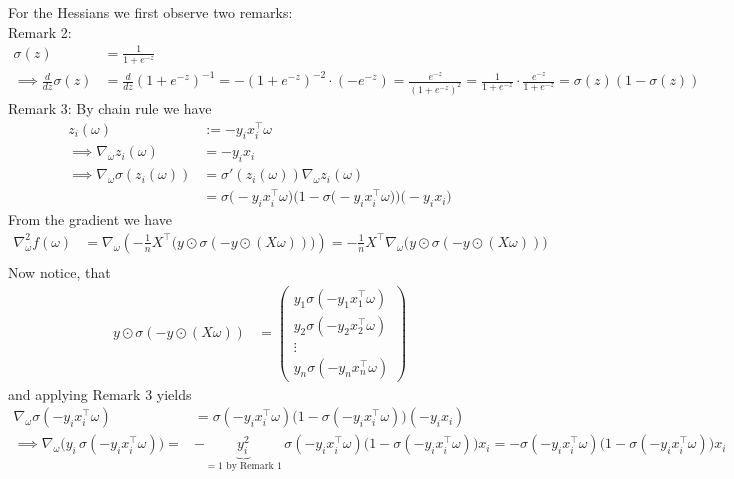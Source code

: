 \documentclass{article}
\begin{document}
For the Hessians we first observe two remarks:\\
Remark 2:
\begin{align*}
  \sigma(z) &= \frac{1}{1 + e^{-z}} \\
  \implies \frac{d}{dz} \sigma(z) &= \frac{d}{dz} (1 + e^{-z})^{-1}
  = -(1 + e^{-z})^{-2} \cdot (-e^{-z}) = \frac{e^{-z}}{(1 + e^{-z})^2}
  = \frac{1}{1 + e^{-z}} \cdot \frac{e^{-z}}{1 + e^{-z}}
  = \sigma(z) (1 - \sigma(z))
\end{align*}
Remark 3: By chain rule we have
\begin{align*}
z_i(\omega) &:= -y_i x_i^\top \omega \\
\implies \nabla_\omega z_i(\omega) &= -y_i x_i \\
\implies \nabla_\omega \sigma(z_i(\omega)) 
&= \sigma'(z_i(\omega)) \nabla_\omega z_i(\omega) \\
&= \sigma\bigl(-y_i x_i^\top \omega\bigr)\bigl(1 - \sigma\bigl(-y_i x_i^\top \omega\bigr)\bigr)\bigl(-y_i x_i\bigr)
\end{align*}
%
From the gradient we have
\begin{align*}
\nabla^2_\omega f(\omega) 
&= \nabla_\omega \left( -\frac{1}{n} X^\top \big(y \odot \sigma(-y \odot (X\omega))\big) \right) = -\frac{1}{n} X^\top \nabla_\omega \big(y \odot \sigma(-y \odot (X\omega))\big) \\
%
\end{align*}
Now notice, that
\begin{align*}
y \odot \sigma(-y \odot (X\omega)) &= \begin{pmatrix}
y_1 \sigma(-y_1 x_1^\top \omega) \\
y_2 \sigma(-y_2 x_2^\top \omega) \\
\vdots \\
y_n \sigma(-y_n x_n^\top \omega)
\end{pmatrix}
\end{align*}
and applying Remark 3 yields 
\begin{align*}
\nabla_\omega \sigma(-y_i x_i^\top \omega) 
&= \sigma(-y_i x_i^\top \omega)\big(1 - \sigma(-y_i x_i^\top \omega)\big)(-y_i x_i) \\
%
\implies \nabla_\omega \big(y_i \, \sigma(-y_i x_i^\top \omega)\big) 
=& -\underbrace{y_i^2}_{=1 \text{ by Remark 1}} \, \sigma(-y_i x_i^\top \omega)\big(1 - \sigma(-y_i x_i^\top \omega)\big) x_i 
=- \sigma(-y_i x_i^\top \omega)\big(1 - \sigma(-y_i x_i^\top \omega)\big) x_i \\
%
\end{align*}
\end{document}
